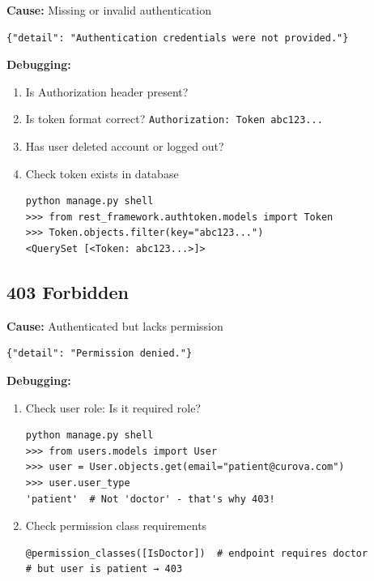 \documentclass[11pt,a4paper,twoside]{report}
\begin{document}
\textbf{Cause:} Missing or invalid authentication

\begin{verbatim}
{"detail": "Authentication credentials were not provided."}
\end{verbatim}

\textbf{Debugging:}
\begin{enumerate}
    \item Is Authorization header present?
    \item Is token format correct? \texttt{Authorization: Token abc123...}
    \item Has user deleted account or logged out?
    \item Check token exists in database

\begin{lstlisting}
python manage.py shell
>>> from rest_framework.authtoken.models import Token
>>> Token.objects.filter(key="abc123...")
<QuerySet [<Token: abc123...>]>
\end{lstlisting}
\end{enumerate}

\subsection{403 Forbidden}

\textbf{Cause:} Authenticated but lacks permission

\begin{verbatim}
{"detail": "Permission denied."}
\end{verbatim}

\textbf{Debugging:}
\begin{enumerate}
    \item Check user role: Is it required role?

\begin{lstlisting}
python manage.py shell
>>> from users.models import User
>>> user = User.objects.get(email="patient@curova.com")
>>> user.user_type
'patient'  # Not 'doctor' - that's why 403!
\end{lstlisting}
    
    \item Check permission class requirements
    \begin{lstlisting}
@permission_classes([IsDoctor])  # endpoint requires doctor
# but user is patient → 403
    \end{lstlisting}
\end{enumerate}
\end{document}
